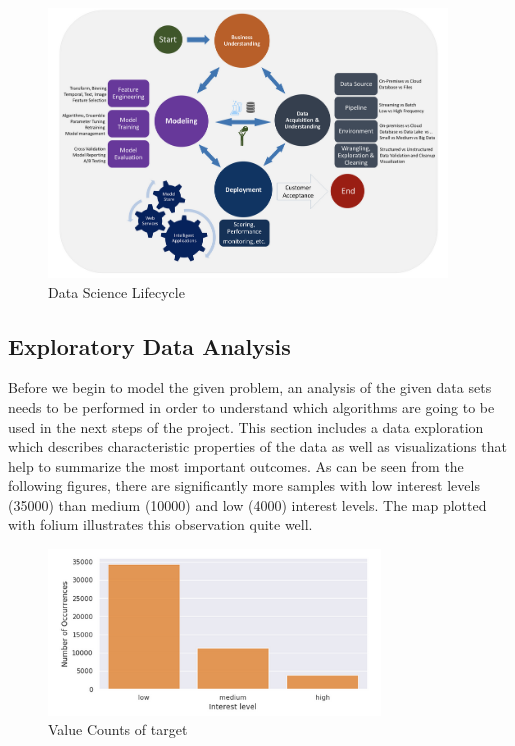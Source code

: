 \documentclass[runningheads]{llncs}
\begin{document}
	\begin{figure}[h!]
      \centering
      \includegraphics[width=300pt]{method.png}
      \caption{Data Science Lifecycle}
      \label{fig:data}
    \end{figure}
    
	\subsection{Exploratory Data Analysis}
	Before we begin to model the given problem, an analysis of the given data sets needs to be performed in order to understand which algorithms are going to be used in the next steps of the project. This section includes a data exploration which describes characteristic properties of the data as well as visualizations that help to summarize the most important outcomes. 
    \newline
    \newline
    As can be seen from the following figures, there are significantly more samples with low interest levels (35000) than medium (10000) and low (4000) interest levels. The map plotted with folium illustrates this observation quite well.
    
    
    \begin{figure}[h!]
      \centering
      \includegraphics[width=250pt]{targetdist.png}
      \caption{Value Counts of target}
      \label{fig:data}
    \end{figure}
    
\end{document}

